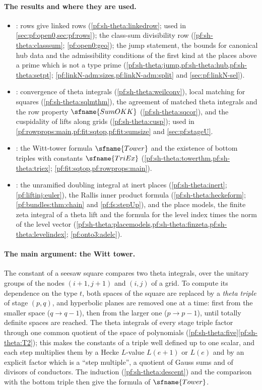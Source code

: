 \paragraph{The results and where they are used.}
\begin{itemize}
\item {}: rows give linked rows (\cref{pf:sh-theta:linkedrow}; used in \cref{sec:pf:open0,sec:pf:rows});
the class-sum divisibility row (\cref{pf:sh-theta:classsum}; \cref{pf:open0:geo}); the jump statement, the bounds for canonical hub
data and the admissibility conditions of the first kind at the places above a prime which is not a type prime
(\cref{pf:sh-theta:jump,pf:sh-theta:hub,pf:sh-theta:setpt}; \cref{pf:linkN-adm:sizes,pf:linkN-adm:split} and \cref{sec:pf:linkN-sel}).
\item {}: convergence of theta integrals (\cref{pf:sh-theta:weilconv}), local matching for squares
(\cref{pf:sh-theta:sqlmthm}), the agreement of matched theta integrals and the row property $\sfname{SumOKK}$
(\cref{pf:sh-theta:sqcor}), and the cuspidality of lifts along grids (\cref{pf:sh-theta:cusp}); used in
\cref{pf:rowprops:main,pf:fit:sqtop,pf:fit:sumsize} and \cref{sec:pf:stageU}.
\item {}: the Witt-tower formula $\sfname{Tower}$ and the existence of bottom triples with constants
$\sfname{TriEx}$ (\cref{pf:sh-theta:towerthm,pf:sh-theta:triex}; \cref{pf:fit:sqtop,pf:rowprops:main}).
\item {}: the unramified doubling integral at inert places (\cref{pf:sh-theta:inert};
\cref{pf:liftinj:euler}), the Rallis inner product formula (\cref{pf:sh-theta:heckeform}; \cref{pf:bundles:thm:chain} and
\cref{pf:fs:stepUp}), and the place models, the finite zeta integral of a theta lift and the formula for the level index times the
norm of the level vector (\cref{pf:sh-theta:placemodels,pf:sh-theta:finzeta,pf:sh-theta:levelindex}; \cref{pf:onto3:adelc}).
\end{itemize}

\paragraph{The main argument: the Witt tower.}
The constant of a seesaw square compares two theta integrals, over the unitary groups of the nodes $(i+1,j+1)$ and $(i,j)$ of a
grid. To compute its dependence on the type $t$, both spaces of the square are replaced by a \emph{theta triple} of stage
$(p,q)$, and hyperbolic planes are removed one at a time: first from the smaller space ($q\to q-1$), then from the larger one
($p\to p-1$), until totally definite spaces are reached. The theta integrals of every stage triple factor through one common
quotient of the space of polynomials (\cref{pf:sh-theta:five}\ref{pf:sh-theta:T2}); this makes the constants of a triple
well defined up to one scalar, and each step multiplies them by a Hecke $L$-value $L(e+1)$ or $L(e)$ and by an explicit factor
which is a ``step multiple'', a quotient of Gauss sums and of divisors of conductors. The induction (\cref{pf:sh-theta:descent})
and the comparison with the bottom triple then give the formula of $\sfname{Tower}$.

